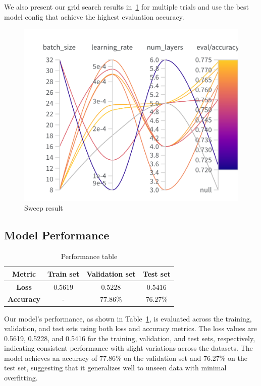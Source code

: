 We also present our grid search results in~\cref{fig:sweep} for multiple trials and use the best model config that achieve the highest evaluation accuracy.

\begin{figure}[h]
    \centering
    \centering
    \includegraphics[width=0.85\linewidth]{images/sweep.png}
    \caption{Sweep result}
    \label{fig:sweep}
\end{figure}



\subsection{Model Performance}

\begin{table}[ht]
    \centering
    \begin{tabular}{c | c | c | c}
    \toprule
    \textbf{Metric} & \textbf{Train set} & \textbf{Validation set} & \textbf{Test set}\\
    \midrule
         \textbf{Loss} & $0.5619$ & $0.5228$ & $0.5416$\\
         \textbf{Accuracy} & - & $77.86\%$ & $76.27\%$\\
    \bottomrule
    \end{tabular}
    \caption{Performance table}
    \label{tab:performance}
\end{table}

Our model's performance, as shown in Table~\ref{tab:performance}, is evaluated across the training, validation, and test sets using both loss and accuracy metrics. The loss values are 0.5619, 0.5228, and 0.5416 for the training, validation, and test sets, respectively, indicating consistent performance with slight variations across the datasets. The model achieves an accuracy of 77.86\% on the validation set and 76.27\% on the test set, suggesting that it generalizes well to unseen data with minimal overfitting.

